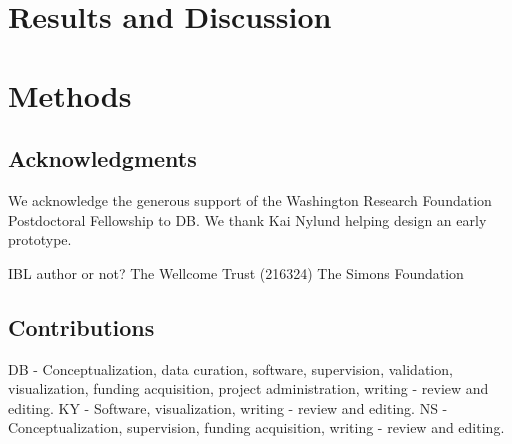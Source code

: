 \documentclass{article}
\begin{document}
\section{Results and Discussion}


\section{Methods}


\subsection{Acknowledgments}

We acknowledge the generous support of the Washington Research Foundation Postdoctoral Fellowship to DB. We thank Kai Nylund helping design an early prototype.

IBL author or not?
The Wellcome Trust (216324)
The Simons Foundation

\subsection{Contributions}

DB - Conceptualization, data curation, software, supervision, validation, visualization, funding acquisition, project administration, writing - review and editing.
KY - Software, visualization, writing - review and editing.
NS - Conceptualization, supervision, funding acquisition, writing - review and editing.

\printbibliography
\end{document}
